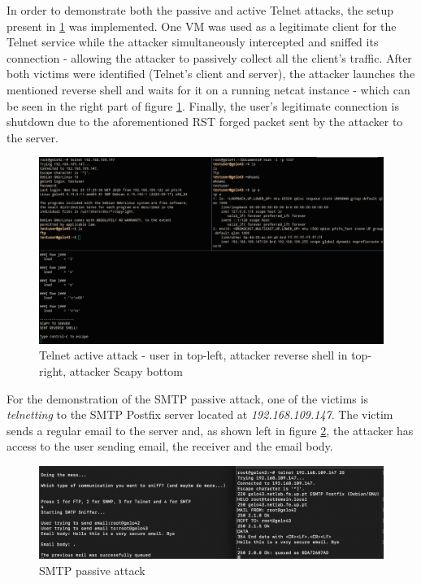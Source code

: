 In order to demonstrate both the passive and active Telnet attacks, the setup
present in \ref{fig:TelnetAttack} was implemented.
One VM was used as a legitimate client for the Telnet service while the 
attacker simultaneously intercepted and sniffed its connection - allowing the 
attacker to passively collect all the client's traffic.
After both victims were identified (Telnet's client and server), the attacker 
launches the mentioned reverse shell and waits for it on a running netcat 
instance - which can be seen in the right part of figure \ref{fig:TelnetAttack}.
Finally, the user's legitimate connection is shutdown due to the aforementioned 
RST forged packet sent by the attacker to the server.

\begin{figure}[h!]
    \centering
    \includegraphics[width=1\linewidth,keepaspectratio]{ReverseShell.png}
    \caption{Telnet active attack - user in top-left, attacker reverse shell 
            in top-right, attacker Scapy bottom}
    \label{fig:TelnetAttack}
\end{figure}
\FloatBarrier


For the demonstration of the SMTP passive attack, one of the victims is \textit{telnetting} to the SMTP Postfix server located at \textit{192.168.109.147}. The victim sends a regular email to the server and, as shown left in figure \ref{fig:SMTPPassiveAttack}, the attacker has access to the user sending email, the receiver and the email body. 
\begin{figure}[h!]
    \centering
    \includegraphics[width=1\linewidth,keepaspectratio]{SMTPAttack.png}
    \caption{SMTP passive attack}
    \label{fig:SMTPPassiveAttack}
\end{figure}
\FloatBarrier
